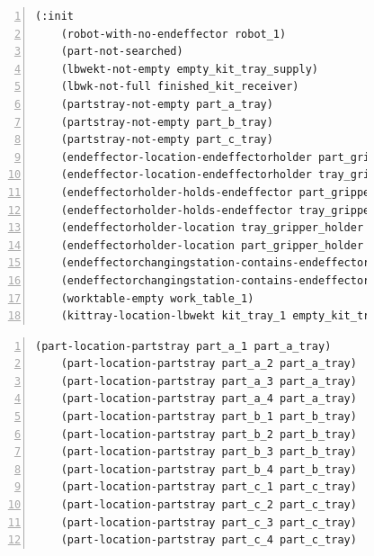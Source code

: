 \begin{figure}[t!h!]
\centering
\begin{minipage}{.5\paperwidth}
\begin{mylisting}
\begin{Verbatim}[commandchars=\\\{\},fontsize=\scriptsize, numbers=left, numbersep=2pt]
(:init
    (robot-with-no-endeffector robot_1)
    (part-not-searched)
    (lbwekt-not-empty empty_kit_tray_supply)	
    (lbwk-not-full finished_kit_receiver)		
    (partstray-not-empty part_a_tray)
    (partstray-not-empty part_b_tray)
    (partstray-not-empty part_c_tray)
    (endeffector-location-endeffectorholder part_gripper part_gripper_holder)
    (endeffector-location-endeffectorholder tray_gripper tray_gripper_holder)
    (endeffectorholder-holds-endeffector part_gripper_holder part_gripper)
    (endeffectorholder-holds-endeffector tray_gripper_holder tray_gripper)
    (endeffectorholder-location tray_gripper_holder changing_station_1)
    (endeffectorholder-location part_gripper_holder changing_station_1)
    (endeffectorchangingstation-contains-endeffectorholder changing_station_1 tray_gripper_holder)	
    (endeffectorchangingstation-contains-endeffectorholder changing_station_1 part_gripper_holder)
    (worktable-empty work_table_1)
    (kittray-location-lbwekt kit_tray_1 empty_kit_tray_supply)
\end{Verbatim}
\end{mylisting}
\end{minipage}
	
\begin{minipage}{.5\paperwidth}
\begin{mylisting}
\begin{Verbatim}[commandchars=\\\{\},fontsize=\scriptsize,  firstnumber=continue, numbers=left, numbersep=2pt]	
    (part-location-partstray part_a_1 part_a_tray)
    (part-location-partstray part_a_2 part_a_tray)
    (part-location-partstray part_a_3 part_a_tray)
    (part-location-partstray part_a_4 part_a_tray)
    (part-location-partstray part_b_1 part_b_tray)
    (part-location-partstray part_b_2 part_b_tray)
    (part-location-partstray part_b_3 part_b_tray)
    (part-location-partstray part_b_4 part_b_tray)
    (part-location-partstray part_c_1 part_c_tray)
    (part-location-partstray part_c_2 part_c_tray)
    (part-location-partstray part_c_3 part_c_tray)
    (part-location-partstray part_c_4 part_c_tray)
\end{Verbatim}
\end{mylisting}
\end{minipage}
	

\end{figure}
